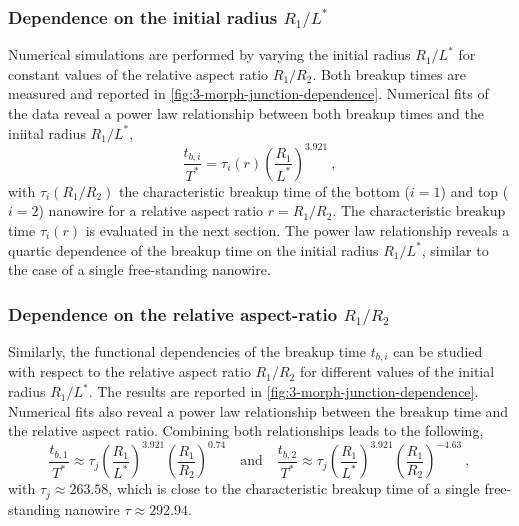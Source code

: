 \subsubsection{Dependence on the initial radius $R_1/L^*$}
Numerical simulations are performed by varying the initial radius $R_1/L^*$ for constant values of the relative aspect ratio $R_1/R_2$. Both breakup times are measured and reported in \autoref{fig:3-morph-junction-dependence}. Numerical fits of the data reveal a power law relationship between both breakup times and the iniital radius $R_1/L^*$,
\begin{equation}
    \frac{t_{b,i}}{T^*} = \tau_{i}\left(r\right) \left(\frac{R_1}{L^*}\right)^{3.921}\ ,
\end{equation}
with $\tau_{i}(R_1/R_2)$ the characteristic breakup time of the bottom ($i=1$) and top ($i=2$) nanowire for a relative aspect ratio $r=R_1/R_2$. The characteristic breakup time $\tau_i(r)$ is evaluated in the next section. The power law relationship reveals a quartic dependence of the breakup time on the initial radius $R_1/L^*$, similar to the case of a single free-standing nanowire. 

\subsubsection{Dependence on the relative aspect-ratio $R_1/R_2$}
Similarly, the functional dependencies of the breakup time $t_{b,i}$ can be studied with respect to the relative aspect ratio $R_1/R_2$ for different values of the initial radius $R_1/L^*$. The results are reported in \autoref{fig:3-morph-junction-dependence}. Numerical fits also reveal a power law relationship between the breakup time and the relative aspect ratio. Combining both relationships leads to the following,
\begin{equation}
    \frac{t_{b,1}}{T^*} \approx \tau_j \left(\frac{R_1}{L^*}\right)^{3.921} \left(\frac{R_1}{R_2}\right)^{0.74} \quad\text{and}\quad \frac{t_{b,2}}{T^*} \approx \tau_j \left(\frac{R_1}{L^*}\right)^{3.921} \left(\frac{R_1}{R_2}\right)^{-4.63}\ ,
\end{equation}
with $\tau_j \approx 263.58$, which is close to the characteristic breakup time of a single free-standing nanowire $\tau \approx 292.94$.

